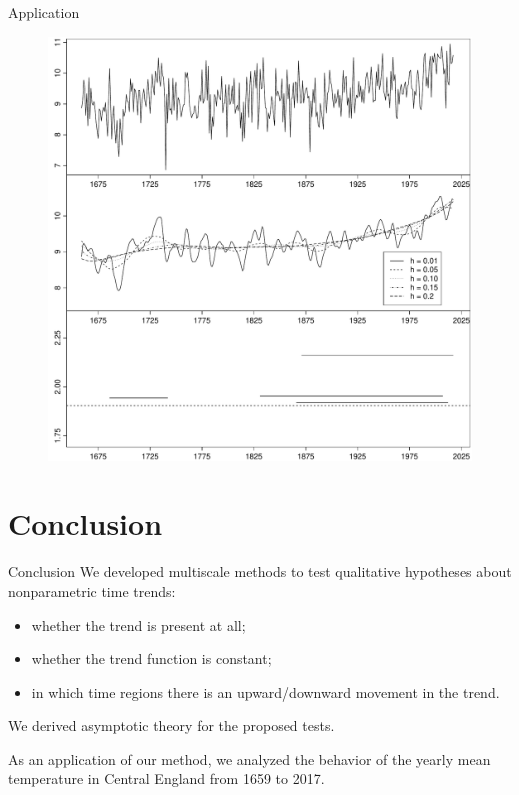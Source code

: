 \documentclass[10pt]{beamer}
\begin{document}
\begin{frame}{Application}
  \begin{figure}
    \centering
    \includegraphics[height=0.85\textheight]{threegraphics_testing_constant_method_ll.pdf}
    \label{figure:shape_results_2}
  \end{figure}
\end{frame}


\section{Conclusion}
\begin{frame}{Conclusion}
We developed multiscale methods to test qualitative hypotheses about nonparametric time trends:
\begin{itemize}
\item whether the trend is present at all;
\item whether the trend function is constant;
\item in which time regions there is an upward/downward movement in the trend.
\end{itemize}
We derived asymptotic theory for the proposed tests.

As an application of our method, we analyzed the behavior of the yearly mean temperature in Central England from 1659 to 2017.
\end{frame}
\end{document}
